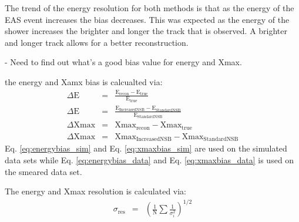 The trend of the energy resolution for both methods is that as the energy of the EAS event increases the bias decreases. This was expected as the energy of the shower increases the brighter and longer the track that is observed. A brighter and longer track allows for a better reconstruction.

- Need to find out what's a good bias value for energy and Xmax.

the energy and Xamx bias is calcualted via:
\begin{eqnarray}
\Delta \mathrm{E} &=& \frac{\mathrm{E}_{\mathrm{recon}} - \mathrm{E}_{\mathrm{true}}}{\mathrm{E}_{\mathrm{true}}}  \label{eq:energybias_sim} \\
\Delta \mathrm{E} &=& \frac{\mathrm{E}_{\mathrm{IncreasedNSB}} - \mathrm{E}_{\mathrm{StandardNSB}}}{\mathrm{E}_{\mathrm{StandardNSB}}} \label{eq:energybias_data} \\
\Delta \mathrm{Xmax} &=& \mathrm{Xmax}_{\mathrm{recon}} - \mathrm{Xmax}_{\mathrm{true}} \label{eq:xmaxbias_sim} \\
\Delta \mathrm{Xmax} &=& \mathrm{Xmax}_{\mathrm{IncreasedNSB}} - \mathrm{Xmax}_{\mathrm{StandardNSB}}\label{eq:xmaxbias_data}
\end{eqnarray}
Eq. \ref{eq:energybias_sim} and Eq. \ref{eq:xmaxbias_sim} are used on the simulated data sets while Eq. \ref{eq:energybias_data} and Eq. \ref{eq:xmaxbias_data} is used on the smeared data set.

The energy and Xmax resolution is calculated via:
\begin{eqnarray}
\sigma_{\mathrm{res}} &=& \left( \frac{1}{\mathrm{N}} \sum \frac{1}{\sigma^2_i} \right)^{1/2}
\end{eqnarray}



